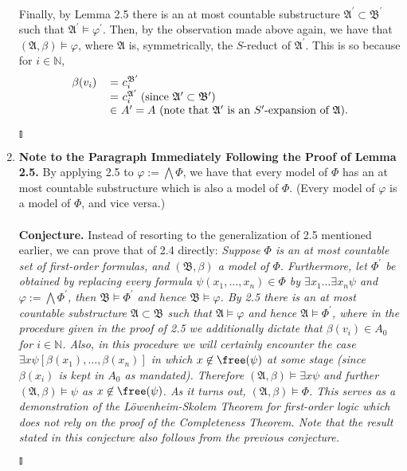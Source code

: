 \begin{enumerate}[1.]
\\
Finally, by Lemma 2.5 there is an at most countable substructure $\mathfrak{A}^\prime \subset \mathfrak{B}^\prime$ such that $\mathfrak{A}^\prime \models \varphi^\prime$. Then, by the observation made above again, we have that $(\mathfrak{A}, \beta) \models \varphi$, where $\mathfrak{A}$ is, symmetrically, the $S$-reduct of $\mathfrak{A}^\prime$. This is so because for $i \in \mathbb{N}$,
\[
\begin{tabular}{lll}
$\beta(v_i)$ & $=$ $c_i^{\mathfrak{B}^\prime}$ \cr
\            & $=$ $c_i^{\mathfrak{A}^\prime}$ (since $\mathfrak{A}^\prime \subset \mathfrak{B}^\prime$) \cr
\            & $\in$ $A^\prime = A$ (note that $\mathfrak{A}^\prime$ is an $S^\prime$-expansion of $\mathfrak{A}$).
\end{tabular}
\]
\begin{flushright}$\talloblong$\end{flushright}
%
\item \textbf{Note to the Paragraph Immediately Following the Proof of Lemma 2.5.} By applying 2.5 to $\varphi := \bigwedge \Phi$, we have that every model of $\Phi$ has an at most countable substructure which is also a model of $\Phi$. (Every model of $\varphi$ is a model of $\Phi$, and vice versa.)\\
\\
\textbf{Conjecture.} Instead of resorting to the generalization of 2.5 mentioned earlier, we can prove that of 2.4 directly: \textit{Suppose $\Phi$ is an at most countable set of first-order formulas, and $(\mathfrak{B}, \beta)$ a model of $\Phi$. Furthermore, let $\Phi^\prime$ be obtained by replacing every formula $\psi(x_1, \ldots, x_n) \in \Phi$ by $\exists x_1 \ldots \exists x_n \psi$ and $\varphi := \bigwedge \Phi^\prime$, then $\mathfrak{B} \models \Phi^\prime$ and hence $\mathfrak{B} \models \varphi$. By 2.5 there is an at most countable substructure $\mathfrak{A} \subset \mathfrak{B}$ such that $\mathfrak{A} \models \varphi$ and hence $\mathfrak{A} \models \Phi^\prime$, where in the procedure given in the proof of 2.5 we additionally dictate that $\beta(v_i) \in A_0$ for $i \in \mathbb{N}$. Also, in this procedure we will certainly encounter the case $\exists x \psi[\beta(x_1), \ldots, \beta(x_n)]$ in which $x \not \in \free(\psi)$ at some stage (since $\beta(x_i)$ is kept in $A_0$ as mandated). Therefore $(\mathfrak{A}, \beta) \models \exists x \psi$ and further $(\mathfrak{A}, \beta) \models \psi$ as $x \not \in \free(\psi)$. As it turns out, $(\mathfrak{A}, \beta) \models \Phi$. This serves as a demonstration of the L\"{o}wenheim-Skolem Theorem for first-order logic which does not rely on the proof of the Completeness Theorem. Note that the result stated in this conjecture also follows from the previous conjecture.}\begin{flushright}$\talloblong$\end{flushright}

\end{enumerate}
